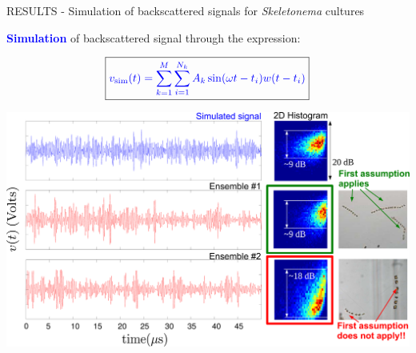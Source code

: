 \documentclass[handout]{beamer}
\newcommand\Fontable{\fontsize{9}{10}\selectfont}
\begin{document}
\begin{frame}{RESULTS - Simulation of backscattered signals for \textit{Skeletonema} cultures}
\Fontable

\textcolor{blue}{\textbf{Simulation}} of backscattered signal through the expression:

\[
\boxed{\textcolor{blue}{v_\text{sim}(t)=\sum_{k=1}^M \sum_{i=1}^{N_k} A_k \sin(\omega t - t_i) w(t - t_i)}}
\]

\vspace{5px}
\includegraphics[width=0.75\paperwidth]{imagenes/sim_vs_meas2_okok.pdf}

\end{frame}
\end{document}
